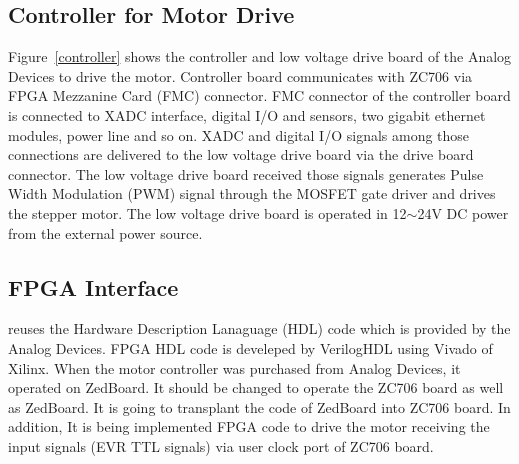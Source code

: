 \documentclass[journal]{IEEEtran}
\begin{document}
\subsection{Controller for Motor Drive}
Figure~\ref{controller} shows the controller and low voltage drive board of the Analog Devices to drive the motor. Controller board communicates with ZC706 via FPGA Mezzanine Card (FMC) connector. FMC connector of the controller board is connected to XADC interface, digital I/O and sensors, two gigabit ethernet modules, power line and so on. XADC and digital I/O signals among those connections are delivered to the low voltage drive board via the drive board connector. The low voltage drive board received those signals generates Pulse Width Modulation (PWM) signal through the MOSFET gate driver and drives the stepper motor. The low voltage drive board is operated in 12${\sim}$24V DC power from the external power source.
\subsection{FPGA Interface}
reuses the Hardware Description Lanaguage (HDL) code which is provided by the Analog Devices. FPGA HDL code is develeped by VerilogHDL using Vivado of Xilinx. When the motor controller was purchased from Analog Devices, it operated on ZedBoard. It should be changed to operate the ZC706 board as well as ZedBoard. It is going to transplant the code of ZedBoard into ZC706 board. In addition, It is being implemented FPGA code to drive the motor receiving the input signals (EVR TTL signals) via user clock port of ZC706 board.
\end{document}
